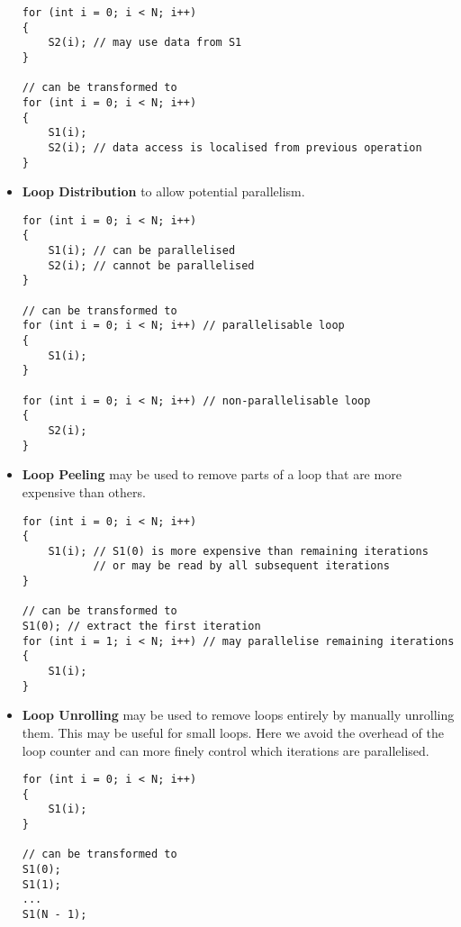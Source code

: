\documentclass{article}
\begin{document}
\begin{itemize}
\begin{verbatim}
for (int i = 0; i < N; i++)
{
    S2(i); // may use data from S1
}

// can be transformed to
for (int i = 0; i < N; i++)
{
    S1(i);
    S2(i); // data access is localised from previous operation
}
\end{verbatim}
    \item \textbf{Loop Distribution} to allow potential parallelism.
          \begin{verbatim}
for (int i = 0; i < N; i++)
{
    S1(i); // can be parallelised
    S2(i); // cannot be parallelised
}

// can be transformed to
for (int i = 0; i < N; i++) // parallelisable loop
{
    S1(i);
}

for (int i = 0; i < N; i++) // non-parallelisable loop
{
    S2(i);
}
\end{verbatim}
    \item \textbf{Loop Peeling} may be used to remove parts of a loop
    that are more expensive than others.
          \begin{verbatim}
for (int i = 0; i < N; i++)
{
    S1(i); // S1(0) is more expensive than remaining iterations
           // or may be read by all subsequent iterations
}

// can be transformed to
S1(0); // extract the first iteration
for (int i = 1; i < N; i++) // may parallelise remaining iterations
{
    S1(i);
}
\end{verbatim}
    \item \textbf{Loop Unrolling} may be used to remove loops entirely
    by manually unrolling them. This may be useful for small loops.
    Here we avoid the overhead of the loop counter and can more finely
    control which iterations are parallelised.
          \begin{verbatim}
for (int i = 0; i < N; i++)
{
    S1(i);
}

// can be transformed to
S1(0);
S1(1);
...
S1(N - 1);
\end{verbatim}
\end{itemize}
\end{document}
